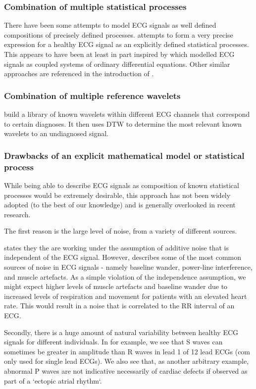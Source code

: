 \documentclass[9pt,conference]{IEEEtran}
\begin{document}
\subsubsection{Combination of multiple statistical processes}
There have been some attempts to model ECG signals as well defined compositions of precisely defined processes. \cite{Napolitano2022Jan} attempts to form a very precise expression for a healthy ECG signal as an explicitly defined statistical processes. This appears to have been at least in part inspired by \cite{coupledECG} which modelled ECG signals as coupled systems of ordinary differential equations. Other similar approaches are referenced in the introduction of \cite{Napolitano2022Jan}.

\subsubsection{Combination of multiple reference wavelets}
\cite{shapeMatch2007} build a library of known wavelets within different ECG channels that correspond to certain diagnoses. It then uses DTW to determine the most relevant known wavelets to an undiagnosed signal. 

\subsubsection{Drawbacks of an explicit mathematical model or statistical process}
While being able to describe ECG signals as composition of known statistical processes would be extremely desirable, this approach has not been widely adopted (to the best of our knowledge) and is generally overlooked in recent research. 

The first reason is the large level of noise, from a variety of different sources.

 \cite{Napolitano2022Jan} states they the are working under the assumption of additive noise that is independent of the ECG signal. However, \cite{ecgNoiseReview} describes some of the most common sources of noise in ECG signals - namely baseline wander, power-line interference, and muscle artefacts. As a simple violation of the independence assumption, we might expect higher levels of muscle artefacts and baseline wander due to increased levels of respiration and movement for patients with an elevated heart rate. This would result in a noise that is correlated to the RR interval of an ECG. 

 Secondly, there is a huge amount of natural variability between healthy ECG signals for different individuals. In \cite{ecgPractice} for example, we see that S waves can sometimes be greater in amplitude than R waves in lead 1 of 12 lead ECGs (com only used for single lead ECGs). We also see that, as another arbitrary example, abnormal P waves are not indicative necessarily of cardiac defects if observed as part of  a `ectopic atrial rhythm`.
\end{document}
